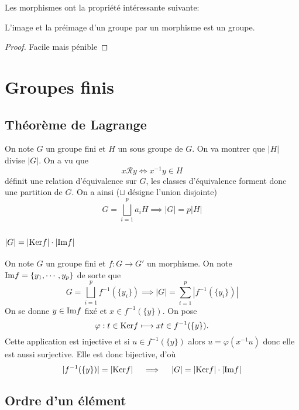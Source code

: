 Les morphismes ont la propriété intéressante suivante:

\begin{prop}
    L'image et la préimage d'un groupe par un morphisme est un groupe.
\end{prop}

\begin{proof}
    Facile mais pénible
\end{proof}

\section{Groupes finis}

\subsection{Théorème de Lagrange}


On note $G$ un groupe fini et $H$ un sous groupe de $G$. On va montrer que $|H|$ divise $|G|$. On a vu que \[
    x\mathcal Ry\iff x^{-1}y\in H
\]
définit une relation d'équivalence sur $G$, les classes d'équivalence forment donc une partition de $G$. On a ainsi ($\sqcup$ désigne l'union disjointe) \[
    G=\bigsqcup_{i=1}^p a_iH \implies |G|=p|H|
\]

\subsection{\texorpdfstring{$|G|=|\mathrm{Ker} f|\cdot |\mathrm{Im} f|$}{\#G=\#Ker f × \#Im f}}

On note $G$ un groupe fini et $f:G\to G'$ un morphisme. On note $\mathrm{Im} f=\{y_1, \cdots, y_p\}$ de sorte que \[
    G=\bigsqcup_{i=1}^p f^{-1}(\{y_i\}) \implies |G|=\sum_{i=1}^p \left| f^{-1}(\{y_i\}) \right|
\]
On se donne $y\in \mathrm{Im} f$ fixé et $x\in f^{-1}(\{y\})$. On pose \[
    \varphi: t\in \mathrm{Ker} f\longmapsto xt\in f^{-1}(\{y\}).
\]
Cette application est injective et si $u\in f^{-1}(\{y\})$ alors $u=\varphi(x^{-1}u)$ donc elle est aussi surjective. Elle est donc bijective, d'où \[
    |f^{-1}(\{y\})|=|\mathrm{Ker} f|\quad \implies \quad |G|=|\mathrm{Ker} f|\cdot |\mathrm{Im} f|
\]

\subsection{Ordre d'un élément}

